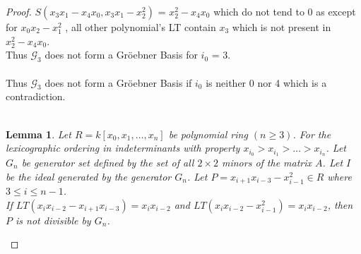 \documentclass[12pt,a4paper]{article}
\newtheorem{lemma}{Lemma}
\theoremstyle{definition}
\begin{document}
\begin{proof}
 $S(x_{3}x_{1} - x_{4}x_{0} , x_{3}x_{1} - x_{2}^2)$ = $x_{2}^2 - x_{4}x_{0}$
which do not tend to 0 
as except for $x_{0}x_{2} - x_{1}^2$ , all other polynomial's LT contain $x_{3}$ which is not present in $x_{2}^2 - x_{4}x_{0}$.\\
Thus $\mathcal{G}_3$ does not form a Gr\"{o}ebner Basis for $i_{0}$ = 3.
\\
\\
Thus $\mathcal{G}_3$ does not form a Gr\"{o}ebner Basis if $i_{0}$ is neither 0 nor 4 which is a contradiction. 
\\
\\
\begin{lemma}
Let $R=k[x_0, x_1, \ldots, x_n]$ be polynomial ring $(n \geq 3)$. For the lexicographic ordering in indeterminants with property $x_{i_0} > x_{i_1} > \ldots > x_{i_n}$. Let $G_n$ be generator set defined by the set of all $2\times 2$ minors of  the matrix $A$. Let $I$ be the ideal generated by the generator $G_n$. Let $P = x_{i+1}x_{i-3}-x_{i-1}^2 \in R$ where $3 \leq i \leq n-1$. \\
If  $LT(x_{i}x_{i-2}-x_{i+1}x_{i-3}) = x_{i}x_{i-2}$ and $LT(x_{i}x_{i-2}-x_{i-1}^2) = x_{i}x_{i-2}$, then $P$ is not divisible by $G_n$. 
\end{lemma}


\end{proof}
\end{document}

